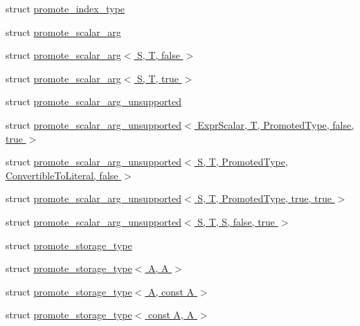 \begin{DoxyCompactItemize}
\item 
struct \hyperlink{struct_eigen_1_1internal_1_1promote__index__type}{promote\+\_\+index\+\_\+type}
\item 
struct \hyperlink{struct_eigen_1_1internal_1_1promote__scalar__arg}{promote\+\_\+scalar\+\_\+arg}
\item 
struct \hyperlink{struct_eigen_1_1internal_1_1promote__scalar__arg_3_01_s_00_01_t_00_01false_01_4}{promote\+\_\+scalar\+\_\+arg$<$ S, T, false $>$}
\item 
struct \hyperlink{struct_eigen_1_1internal_1_1promote__scalar__arg_3_01_s_00_01_t_00_01true_01_4}{promote\+\_\+scalar\+\_\+arg$<$ S, T, true $>$}
\item 
struct \hyperlink{struct_eigen_1_1internal_1_1promote__scalar__arg__unsupported}{promote\+\_\+scalar\+\_\+arg\+\_\+unsupported}
\item 
struct \hyperlink{struct_eigen_1_1internal_1_1promote__scalar__arg__unsupported_3_01_expr_scalar_00_01_t_00_01_prob0c1a954168835d1f7a6330930c12504}{promote\+\_\+scalar\+\_\+arg\+\_\+unsupported$<$ Expr\+Scalar, T, Promoted\+Type, false, true $>$}
\item 
struct \hyperlink{struct_eigen_1_1internal_1_1promote__scalar__arg__unsupported_3_01_s_00_01_t_00_01_promoted_type917020263f1acda837ffc1763f00e3e6}{promote\+\_\+scalar\+\_\+arg\+\_\+unsupported$<$ S, T, Promoted\+Type, Convertible\+To\+Literal, false $>$}
\item 
struct \hyperlink{struct_eigen_1_1internal_1_1promote__scalar__arg__unsupported_3_01_s_00_01_t_00_01_promoted_type_00_01true_00_01true_01_4}{promote\+\_\+scalar\+\_\+arg\+\_\+unsupported$<$ S, T, Promoted\+Type, true, true $>$}
\item 
struct \hyperlink{struct_eigen_1_1internal_1_1promote__scalar__arg__unsupported_3_01_s_00_01_t_00_01_s_00_01false_00_01true_01_4}{promote\+\_\+scalar\+\_\+arg\+\_\+unsupported$<$ S, T, S, false, true $>$}
\item 
struct \hyperlink{struct_eigen_1_1internal_1_1promote__storage__type}{promote\+\_\+storage\+\_\+type}
\item 
struct \hyperlink{struct_eigen_1_1internal_1_1promote__storage__type_3_01_a_00_01_a_01_4}{promote\+\_\+storage\+\_\+type$<$ A, A $>$}
\item 
struct \hyperlink{struct_eigen_1_1internal_1_1promote__storage__type_3_01_a_00_01const_01_a_01_4}{promote\+\_\+storage\+\_\+type$<$ A, const A $>$}
\item 
struct \hyperlink{struct_eigen_1_1internal_1_1promote__storage__type_3_01const_01_a_00_01_a_01_4}{promote\+\_\+storage\+\_\+type$<$ const A, A $>$}

\end{DoxyCompactItemize}
